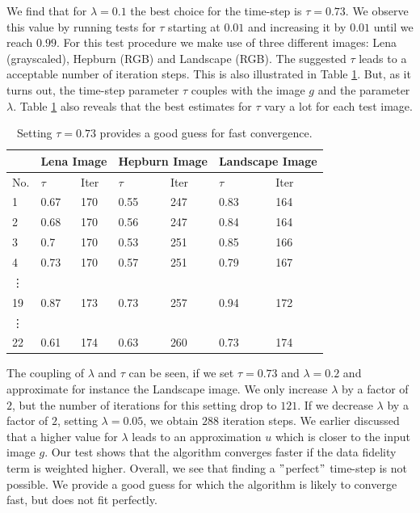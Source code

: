 \documentclass[abstracton]{scrreprt}
\begin{document}
            We find that for $\lambda = 0.1$ the best choice for the time-step is $\tau = 0.73$. We observe this value by running tests for $\tau$ starting at $0.01$ and increasing it by $0.01$ until we reach $0.99$. For this test procedure we make use of three different images: Lena (grayscaled), Hepburn (RGB) and Landscape (RGB). The suggested $\tau$ leads to a acceptable number of iteration steps. This is also illustrated in Table \ref{tab:estimation_of_tau_rof}. But, as it turns out, the time-step parameter $\tau$ couples with the image $g$ and the parameter $\lambda$. Table \ref{tab:estimation_of_tau_rof} also reveals that the best estimates for $\tau$ vary a lot for each test image.
            \begin{table}[!ht]
                \centering
                \begin{tabular}{| l | l | l | l | l | l | l |}
                    \hline
                    & \multicolumn{2}{|c|}{Lena Image} & \multicolumn{2}{|c|}{Hepburn Image} & \multicolumn{2}{|c|}{Landscape Image} \\ \hline\hline
                    No. & $\tau$ & Iter & $\tau$ & Iter & $\tau$ & Iter \\ \hline
                    1 & 0.67 & 170 & 0.55 & 247 & 0.83 & 164 \\ \hline
                    2 & 0.68 & 170 & 0.56 & 247 & 0.84 & 164 \\ \hline
                    3 & 0.7 & 170 & 0.53 & 251 & 0.85 & 166 \\ \hline
                    4 & 0.73 & 170 & 0.57 & 251 & 0.79 & 167 \\ \hline
                    \vdots &  &  &  &  &  & \\ \hline
                    19 & 0.87 & 173 & 0.73 & 257 & 0.94 & 172 \\ \hline
                    \vdots &  &  &  &  &  & \\ \hline
                    22 & 0.61 & 174 & 0.63 & 260 & 0.73 & 174 \\ \hline
                \end{tabular}
                \caption[Best estimate of $\tau$ for the ROF model.]{Setting $\tau = 0.73$ provides a good guess for fast convergence.}
                \label{tab:estimation_of_tau_rof}
            \end{table}
            The coupling of $\lambda$ and $\tau$ can be seen, if we set $\tau = 0.73$ and $\lambda = 0.2$ and approximate for instance the Landscape image. We only increase $\lambda$ by a factor of $2$, but the number of iterations for this setting drop to $121$. If we decrease $\lambda$ by a factor of $2$, setting $\lambda = 0.05$, we obtain $288$ iteration steps. We earlier discussed that a higher value for $\lambda$ leads to an approximation $u$ which is closer to the input image $g$. Our test shows that the algorithm converges faster if the data fidelity term is weighted higher. Overall, we see that finding a $"$perfect$"$ time-step is not possible. We provide a good guess for which the algorithm is likely to converge fast, but does not fit perfectly.\\
\end{document}
